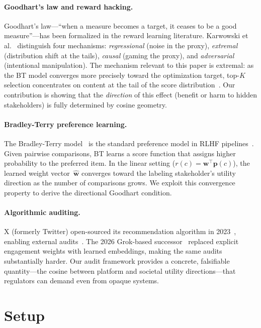 \documentclass[11pt,letterpaper]{article}
\begin{document}
\paragraph{Goodhart's law and reward hacking.}
Goodhart's law---``when a measure becomes a target, it ceases to be a
good measure''---has been formalized in the reward learning
literature. Karwowski et al.~\cite{skalse2024goodhart} distinguish four mechanisms:
\emph{regressional} (noise in the proxy), \emph{extremal}
(distribution shift at the tails), \emph{causal} (gaming the proxy),
and \emph{adversarial} (intentional manipulation). The mechanism
relevant to this paper is extremal: as the BT model converges more
precisely toward the optimization target, top-$K$ selection
concentrates on content at the tail of the score
distribution~\cite{casper2023open, weng2024reward}. Our contribution
is showing that the \emph{direction} of this effect (benefit or harm
to hidden stakeholders) is fully determined by cosine geometry.

\paragraph{Bradley-Terry preference learning.}
The Bradley-Terry model~\cite{bradley1952rank} is the standard
preference model in RLHF pipelines~\cite{sun2025rethinking}.
Given pairwise comparisons, BT learns a score function that assigns
higher probability to the preferred item. In the linear setting
($r(c) = \mathbf{w}^\top \mathbf{p}(c)$), the learned weight
vector~$\hat{\mathbf{w}}$ converges toward the labeling stakeholder's
utility direction as the number of comparisons grows. We exploit this
convergence property to derive the directional Goodhart condition.

\paragraph{Algorithmic auditing.}
X (formerly Twitter) open-sourced its recommendation algorithm in
2023~\cite{xalgorithm2023}, enabling external
audits~\cite{lasser2025designing}. The 2026 Grok-based
successor~\cite{xalgorithm2026} replaced explicit engagement weights
with learned embeddings, making the same audits substantially harder.
Our audit framework provides a concrete, falsifiable quantity---the
cosine between platform and societal utility directions---that
regulators can demand even from opaque systems.

\section{Setup}
\label{sec:setup}
\end{document}
